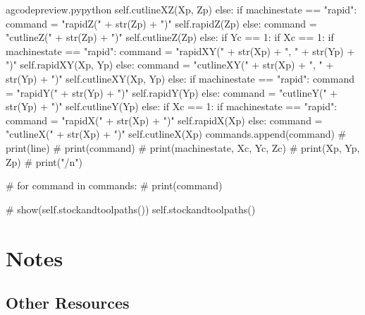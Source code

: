 \documentclass{ltxdoc}
\begin{document}
\begin{writecode}{a}{gcodepreview.py}{python}
                                self.cutlineXZ(Xp, Zp)
                        else:
                            if machinestate == "rapid":
                                command = "rapidZ(" + str(Zp) + ")"
                                self.rapidZ(Zp)
                            else: 
                                command = "cutlineZ(" + str(Zp) + ")"
                                self.cutlineZ(Zp)
                else:
                    if Yc == 1:
                        if Xc == 1:
                            if machinestate == "rapid":
                                command = "rapidXY(" + str(Xp) + ", " + str(Yp) + ")"
                                self.rapidXY(Xp, Yp)
                            else: 
                                command = "cutlineXY(" + str(Xp) + ", " + str(Yp) + ")"
                                self.cutlineXY(Xp, Yp)
                        else:
                            if machinestate == "rapid":
                                command = "rapidY(" + str(Yp) + ")"
                                self.rapidY(Yp)
                            else: 
                                command = "cutlineY(" + str(Yp) + ")"
                                self.cutlineY(Yp)
                    else:
                        if Xc == 1:
                            if machinestate == "rapid":
                                command = "rapidX(" + str(Xp) + ")"
                                self.rapidX(Xp)
                            else: 
                                command = "cutlineX(" + str(Xp) + ")"
                                self.cutlineX(Xp)
                commands.append(command)
#                print(line)
#                print(command)
#                print(machinestate, Xc, Yc, Zc)
#                print(Xp, Yp, Zp)
#                print("/n")

#        for command in commands:
#            print(command)

#        show(self.stockandtoolpaths())
        self.stockandtoolpaths()

\end{writecode}
\addtocounter{gcpy}{137}

\section{Notes}

\subsection{Other Resources}
\end{document}
